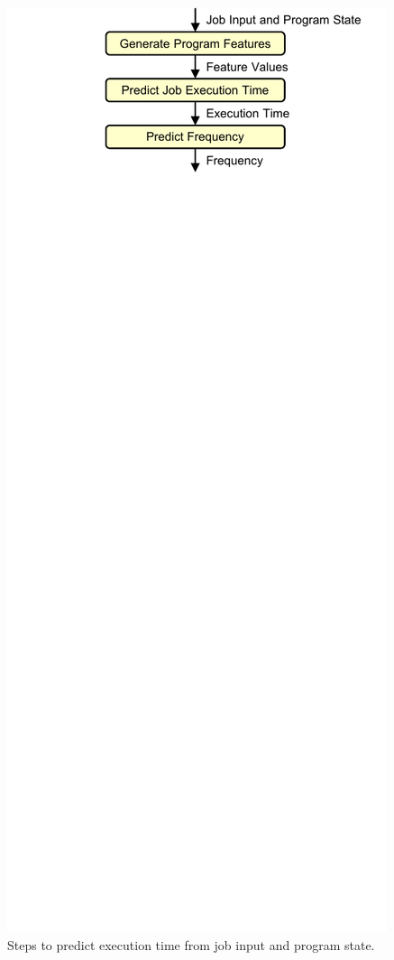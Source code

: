 \begin{figure}
  \begin{center}
    \includegraphics{exec_time_prediction/figs/prediction_flow.pdf}
    \caption{Steps to predict execution time from job input and program state.}
    \label{fig:prediction.prediction_flow}
  \end{center}
\end{figure}

